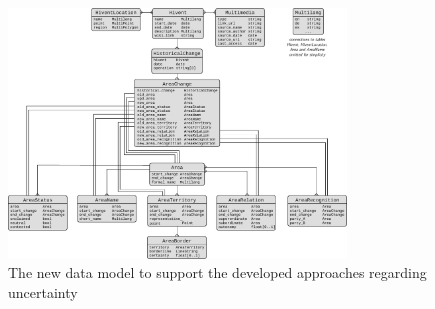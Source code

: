 \begin{figure}[ht]
  \centering
  \includegraphics[width = 0.8\textwidth]{graphics/uncertainty/new_data_model}
  \caption{The new data model to support the developed approaches regarding uncertainty}
  \label{fig:new_data_model}
\end{figure}





